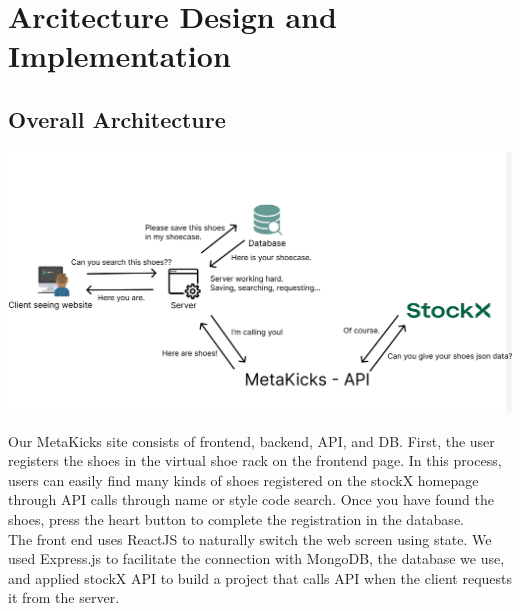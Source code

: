 \documentclass[conference]{IEEEtran}
\begin{document}
\section{Arcitecture Design and Implementation}
\subsection{Overall Architecture}
\centerline{\includegraphics[scale=0.2]{pics/service_construct.png}}
Our MetaKicks site consists of frontend, backend, API, and DB. First, the user registers the shoes in the virtual shoe rack on the frontend page. In this process, users can easily find many kinds of shoes registered on the stockX homepage through API calls through name or style code search. Once you have found the shoes, press the heart button to complete the registration in the database.\\
The front end uses ReactJS to naturally switch the web screen using state. We used Express.js to facilitate the connection with MongoDB, the database we use, and applied stockX API to build a project that calls API when the client requests it from the server.\\
\end{document}
